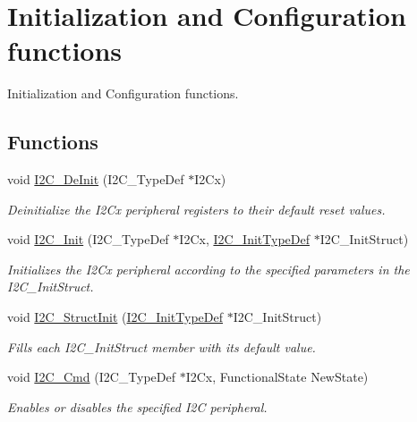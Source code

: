 \hypertarget{group___i2_c___group1}{\section{Initialization and Configuration functions}
\label{group___i2_c___group1}
}


Initialization and Configuration functions.  


\subsection*{Functions}
\begin{DoxyCompactItemize}
\item 
void \hyperlink{group___i2_c___group1_ga2ee214364603059ad5d9089f749f5bfd}{I2\-C\-\_\-\-De\-Init} (I2\-C\-\_\-\-Type\-Def $\ast$I2\-Cx)
\begin{DoxyCompactList}\small\item\em Deinitialize the I2\-Cx peripheral registers to their default reset values. \end{DoxyCompactList}\item 
void \hyperlink{group___i2_c___group1_gaac29465bca70fbc91c2f922ab67bb88e}{I2\-C\-\_\-\-Init} (I2\-C\-\_\-\-Type\-Def $\ast$I2\-Cx, \hyperlink{struct_i2_c___init_type_def}{I2\-C\-\_\-\-Init\-Type\-Def} $\ast$I2\-C\-\_\-\-Init\-Struct)
\begin{DoxyCompactList}\small\item\em Initializes the I2\-Cx peripheral according to the specified parameters in the I2\-C\-\_\-\-Init\-Struct. \end{DoxyCompactList}\item 
void \hyperlink{group___i2_c___group1_ga08582aca6d7d7910cd5cbff0d9def350}{I2\-C\-\_\-\-Struct\-Init} (\hyperlink{struct_i2_c___init_type_def}{I2\-C\-\_\-\-Init\-Type\-Def} $\ast$I2\-C\-\_\-\-Init\-Struct)
\begin{DoxyCompactList}\small\item\em Fills each I2\-C\-\_\-\-Init\-Struct member with its default value. \end{DoxyCompactList}\item 
void \hyperlink{group___i2_c___group1_ga7e1323c9133c2cb424dfb5b10b7d2f0b}{I2\-C\-\_\-\-Cmd} (I2\-C\-\_\-\-Type\-Def $\ast$I2\-Cx, Functional\-State New\-State)
\begin{DoxyCompactList}\small\item\em Enables or disables the specified I2\-C peripheral. \end{DoxyCompactList}\item 

\end{DoxyCompactItemize}
